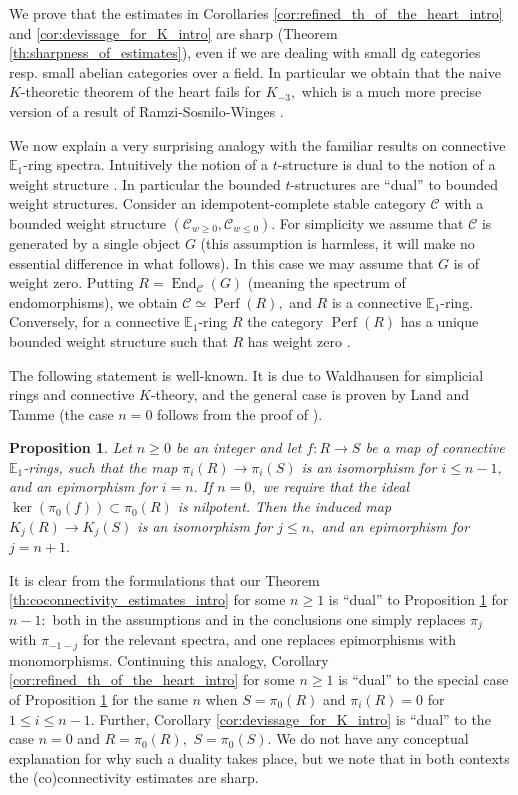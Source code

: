 \documentclass[11pt,leqno]{amsart}
\newtheorem{prop}[theo]{Proposition}
\numberwithin{equation}{section}
\def\End{\operatorname{End}}
\newcommand{\bE}{{\mathbb E}}
\newcommand{\cC}{{\mathcal C}}
\newcommand{\Perf}{\operatorname{Perf}}
\begin{document}
We prove that the estimates in Corollaries \ref{cor:refined_th_of_the_heart_intro} and \ref{cor:devissage_for_K_intro} are sharp (Theorem \ref{th:sharpness_of_estimates}), even if we are dealing with small dg categories resp. small abelian categories over a field. In particular we obtain that the naive $K$-theoretic theorem of the heart fails for $K_{-3},$ which is a much more precise version of a result of Ramzi-Sosnilo-Winges \cite[Theorem B]{RSW24}.

We now explain a very surprising analogy with the familiar results on connective $\bE_1$-ring spectra. Intuitively the notion of a $t$-structure is dual to the notion of a weight structure \cite{Bon, Sos19}. In particular the bounded $t$-structures are ``dual'' to bounded weight structures. Consider an idempotent-complete stable category $\cC$ with a bounded weight structure $(\cC_{w\geq 0},\cC_{w\leq 0}).$ For simplicity we assume that $\cC$ is generated by a single object $G$ (this assumption is harmless, it will make no essential difference in what follows).  In this case we may assume that $G$ is of weight zero. Putting $R=\End_{\cC}(G)$ (meaning the spectrum of endomorphisms), we obtain $\cC\simeq\Perf(R),$ and $R$ is a connective $\bE_1$-ring. Conversely, for a connective $\bE_1$-ring $R$ the category $\Perf(R)$ has a unique bounded weight structure such that $R$ has weight zero \cite{Sos19}.

The following statement is well-known. It is due to Waldhausen \cite{Wal78} for simplicial rings and connective $K$-theory, and the general case is proven by Land and Tamme \cite{LT19} (the case $n=0$ follows from the proof of \cite[Corollary 3.5]{LT19}).

\begin{prop}\cite[Proposition 1.1]{Wal78} \cite[Lemma 2.4]{LT19} \label{prop:connectivity_estimates}
Let $n\geq 0$ be an integer and let $f:R\to S$ be a map of connective $\bE_1$-rings, such that the map $\pi_i(R)\to\pi_i(S)$ is an isomorphism for $i\leq n-1,$ and an epimorphism for $i = n.$ If $n=0,$ we require that the ideal $\ker(\pi_0(f))\subset \pi_0(R)$ is nilpotent. Then the induced map $K_j(R)\to K_j(S)$ is an isomorphism for $j\leq n,$ and an epimorphism for $j = n+1.$
\end{prop}

It is clear from the formulations that our Theorem \ref{th:coconnectivity_estimates_intro} for some $n\geq 1$ is ``dual'' to Proposition \ref{prop:connectivity_estimates} for $n-1:$ both in the assumptions and in the conclusions one simply replaces $\pi_j$ with $\pi_{-1-j}$ for the relevant spectra, and one replaces epimorphisms with monomorphisms. Continuing this analogy, Corollary \ref{cor:refined_th_of_the_heart_intro} for some $n\geq 1$ is ``dual'' to the special case of Proposition \ref{prop:connectivity_estimates} for the same $n$ when $S=\pi_0(R)$ and $\pi_i(R)=0$ for $1\leq i\leq n-1.$ Further, Corollary \ref{cor:devissage_for_K_intro} is ``dual'' to the case $n=0$ and $R=\pi_0(R),$ $S=\pi_0(S).$  We do not have any conceptual explanation for why such a duality takes place, but we note that in both contexts the (co)connectivity estimates are sharp. 
\end{document}

